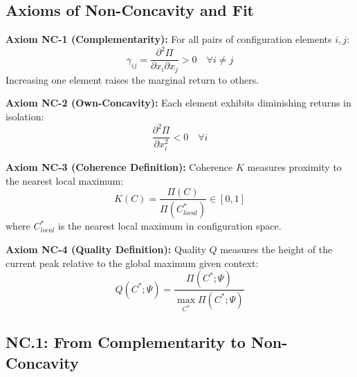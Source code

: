 
\subsection{Axioms of Non-Concavity and Fit}
\label{sec:nc-axioms}

\begin{tcolorbox}[colback=gray!5!white, colframe=gray!75!black]
\textbf{Axiom NC-1 (Complementarity):}
For all pairs of configuration elements $i, j$:
\begin{equation}
\gamma_{ij} = \frac{\partial^2 \Pi}{\partial x_i \partial x_j} > 0 \quad \forall i \neq j
\label{ax:nc-1}
\end{equation}
Increasing one element raises the marginal return to others.

\textbf{Axiom NC-2 (Own-Concavity):}
Each element exhibits diminishing returns in isolation:
\begin{equation}
\frac{\partial^2 \Pi}{\partial x_i^2} < 0 \quad \forall i
\label{ax:nc-2}
\end{equation}

\textbf{Axiom NC-3 (Coherence Definition):}
Coherence $K$ measures proximity to the nearest local maximum:
\begin{equation}
K(C) = \frac{\Pi(C)}{\Pi(C^*_{local})} \in [0, 1]
\label{ax:nc-3}
\end{equation}
where $C^*_{local}$ is the nearest local maximum in configuration space.

\textbf{Axiom NC-4 (Quality Definition):}
Quality $Q$ measures the height of the current peak relative to the global maximum given context:
\begin{equation}
Q(C^*; \Psi) = \frac{\Pi(C^*; \Psi)}{\max_{C^*} \Pi(C^*; \Psi)}
\label{ax:nc-4}
\end{equation}
\end{tcolorbox}


\subsection{NC.1: From Complementarity to Non-Concavity}
\label{sec:nc-nonconcavity}

